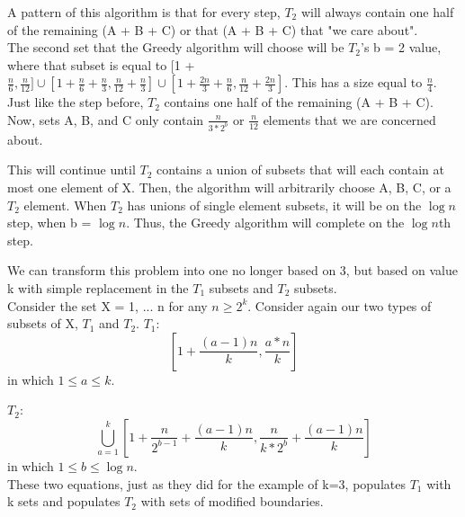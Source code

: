 \documentclass[11pt, solution, letterpaper]{format}
\begin{document}
A pattern of this algorithm is that for every step, $T_2$ will always contain one half of the remaining (A + B + C) or that (A + B + C) that "we care about". \\

The second set that the Greedy algorithm will choose will be $T_2$'s b = 2 value, where that subset is equal to [1 + $\frac{n}{6}, \frac{n}{12}] \cup [1 + \frac{n}{6} + \frac{n}{3}, \frac{n}{12} + \frac{n}{3}] \cup [1 + \frac{2n}{3} + \frac{n}{6}, \frac{n}{12} + \frac{2n}{3}]$. This has a size equal to  $\frac{n}{4}$. Just like the step before, $T_2$ contains one half of the remaining (A + B + C). Now, sets A, B, and C only contain $\frac{n}{3*2^b}$ or $\frac{n}{12}$ elements that we are concerned about.

This will continue until $T_2$ contains a union of subsets that will each contain at most one element of X. Then, the algorithm will arbitrarily choose A, B, C, or a $T_2$ element. When $T_2$ has unions of single element subsets, it will be on the $\log n$ step, when b = $\log n$. Thus, the Greedy algorithm will complete on the $\log n$th step.


We can transform this problem into one no longer based on 3, but based on value k with simple replacement in the $T_1$ subsets and $T_2$ subsets.\\
Consider the set X = 1, ... n for any $n \geq 2^k$. Consider again our two types of subsets of X, $T_1$ and $T_2$.
$T_1$: 
 $${[1 + \frac{(a-1)n}{k}, \frac{a*n}{k}]}$$ in which $1 \leq a \leq k$. 

$T_2$: 
$$\bigcup_{a=1}^{k} [1 + \frac{n}{2^{b-1}} + \frac{(a-1)n}{k}, \frac{n}{k*2^b} + \frac{(a-1)n}{k}]$$
 in which $1 \leq b \leq \log n$. \\
 
These two equations, just as they did for the example of k=3, populates $T_1$ with k sets and populates $T_2$ with sets of modified boundaries.
\clearpage
\end{document}
